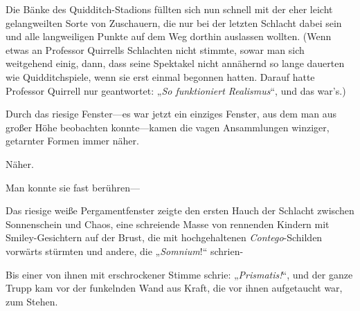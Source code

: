 Die Bänke des Quidditch-Stadions füllten sich nun schnell mit der eher leicht gelangweilten Sorte von Zuschauern, die nur bei der letzten Schlacht dabei sein und alle langweiligen Punkte auf dem Weg dorthin auslassen wollten. (Wenn etwas an Professor Quirrells Schlachten nicht stimmte, sowar man sich weitgehend einig, dann, dass seine Spektakel nicht annähernd so lange dauerten wie Quidditchspiele, wenn sie erst einmal begonnen hatten. Darauf hatte Professor Quirrell nur geantwortet: „\emph{So funktioniert Realismus}“, und das war’s.)

Durch das riesige Fenster—es war jetzt ein einziges Fenster, aus dem man aus großer Höhe beobachten konnte—kamen die vagen Ansammlungen winziger, getarnter Formen immer näher.

Näher.

Man konnte sie fast berühren—

\later

Das riesige weiße Pergamentfenster zeigte den ersten Hauch der Schlacht zwischen Sonnenschein und Chaos, eine schreiende Masse von rennenden Kindern mit Smiley-Gesichtern auf der Brust, die mit hochgehaltenen \emph{Contego}-Schilden vorwärts stürmten und andere, die „\emph{Somnium}!“ schrien-

Bis einer von ihnen mit erschrockener Stimme schrie: „\emph{Prismatis!}“, und der ganze Trupp kam vor der funkelnden Wand aus Kraft, die vor ihnen aufgetaucht war, zum Stehen.

